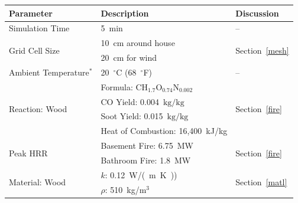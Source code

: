\documentclass[12pt,oneside]{book}
\renewcommand{\C}{\mbox{C}}
\renewcommand{\H}{\mbox{H}}
\renewcommand{\O}{\mbox{O}}
\newcommand{\N}{\mbox{N}}
\begin{document}
\begin{table}[!ht]
\centering
{}\label{tab:mod_param}
\begin{tabular}{lll}
\toprule[1.5pt]
Parameter                                                  & Description                                   & Discussion                            \\
\midrule
Simulation Time                                            &  5~min                                        & --                                    \\ [.25cm]
\multirow{2}{*}{Grid Cell Size}                            &  10~cm around house                           & \multirow{2}{*}{Section~\ref{mesh}}   \\ 
                                                           &  20~cm for wind                               &                                       \\ [.25cm]
Ambient Temperature$^*$                                    &  20~$^{\circ}$C (68~$^{\circ}$F)              & --                                    \\ [.1cm]
\multirow{4}{*}{Reaction: Wood~\cite{SFPE:Tewarson}}       &  Formula: $\C\H_{1.7}\O_{0.74}\N_{0.002}$     & \multirow{4}{*}{Section~\ref{fire}}   \\
                                                           &  CO Yield: 0.004~$\mathrm{kg}/\mathrm{kg}$    &                                       \\
                                                           &  Soot Yield: 0.015~$\mathrm{kg}/\mathrm{kg}$  &                                       \\
                                                           &  Heat of Combustion: 16,400~kJ/kg             &                                       \\ [.25cm]
\multirow{2}{*}{Peak HRR}                                  &  Basement Fire: 6.75~MW                       & \multirow{2}{*}{Section~\ref{fire}}   \\ 
                                                           &  Bathroom Fire: 1.8~MW                        &                                       \\ [.25cm]                     
\multirow{3}{*}{Material: Wood~\cite{Incropera:1} }        &  $k$: 0.12~\si{W/(m.K)})                      & \multirow{3}{*}{Section~\ref{matl}}   \\
                                                           &  $\rho$: 510~kg/m$^3$                         &                                       \\

\end{tabular}
\end{table}
\end{document}
